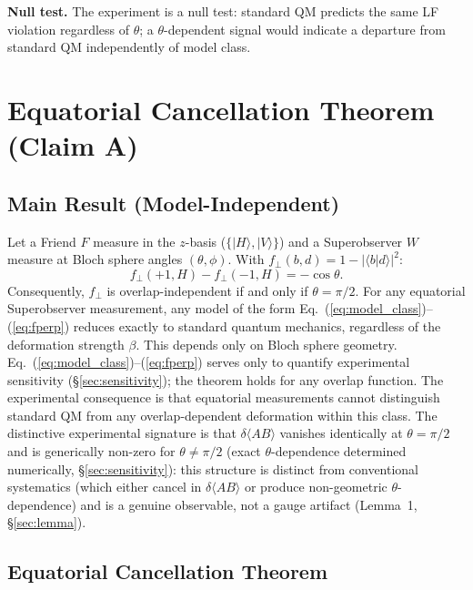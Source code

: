 \documentclass[twocolumn,aps,pra,superscriptaddress,floatfix,10pt]{revtex4-2}
\begin{document}
\textbf{Null test.} The experiment is a null test: standard QM predicts the same
LF violation regardless of $\theta$; a $\theta$-dependent signal would indicate a
departure from standard QM independently of model class.

\section{Equatorial Cancellation Theorem (Claim A)}
\label{sec:theorem}

\subsection{Main Result (Model-Independent)}
\label{sec:main_result}

Let a Friend $F$ measure in the $z$-basis ($\{|H\rangle, |V\rangle\}$) and a Superobserver $W$ measure
at Bloch sphere angles $(\theta, \phi)$. With $f_\perp(b,d) = 1 - |\langle b|d\rangle|^2$:
\begin{equation}
f_\perp(+1, H) - f_\perp(-1, H) = -\cos\theta.
\label{eq:cancel}
\end{equation}
Consequently, $f_\perp$ is overlap-independent if and only if $\theta = \pi/2$. For any
equatorial Superobserver measurement, any model of the form Eq.~(\ref{eq:model_class})--(\ref{eq:fperp}) reduces
exactly to standard quantum mechanics, regardless of the deformation strength $\beta$.
This depends only on Bloch sphere geometry. Eq.~(\ref{eq:model_class})--(\ref{eq:fperp}) serves only to quantify experimental sensitivity (\S\ref{sec:sensitivity});
the theorem holds for any overlap function.
The experimental consequence is that equatorial measurements cannot
distinguish standard QM from any overlap-dependent deformation within this
class. The distinctive experimental signature is that $\delta\langle AB\rangle$ vanishes
identically at $\theta = \pi/2$ and is generically non-zero for $\theta \neq \pi/2$ (exact
$\theta$-dependence determined numerically, \S\ref{sec:sensitivity}): this
structure is distinct from conventional systematics (which either cancel in
$\delta\langle AB\rangle$ or produce non-geometric $\theta$-dependence) and is a genuine observable,
not a gauge artifact (Lemma~1, \S\ref{sec:lemma}).

\subsection{Equatorial Cancellation Theorem}
\label{sec:ect}
\end{document}
